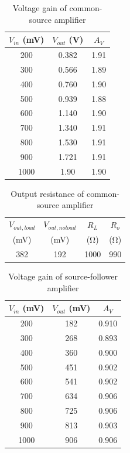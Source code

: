 \begin{table}[hbtp]
  \centering
  \begin{tabular}{ccc}
    $V_{in}$ (\si{mV}) & $V_{out}$ (\si{V}) & $A_V$ \\
    \hline
    200                & 0.382              & 1.91  \\
    300                & 0.566              & 1.89  \\
    400                & 0.760              & 1.90  \\
    500                & 0.939              & 1.88  \\
    600                & 1.140              & 1.90  \\
    700                & 1.340              & 1.91  \\
    800                & 1.530              & 1.91  \\
    900                & 1.721              & 1.91  \\
    1000               & 1.90               & 1.90  \\
  \end{tabular}
  \caption{\label{tab:common-source} Voltage gain of common-source amplifier}
\end{table}

\begin{table}[hbtp]
  \centering
  \begin{tabular}{cccc}
    $V_{out,load}$ & $V_{out,no load}$ & $R_L$ & $R_o$ \\
    (\si{mV}) & (\si{mV}) & (\si{\ohm}) & (\si{\ohm}) \\
    \hline
    382 & 192 & 1000 & 990 \\
    \end{tabular}
    \caption{\label{tab:ro_common} Output resistance of common-source amplifier}
\end{table}

\begin{table}[hbtp]
  \centering
  \begin{tabular}{ccc}
    $V_{in}$ (\si{mV}) & $V_{out}$ (\si{mV}) & $A_V$ \\
    \hline
    200                & 182                 & 0.910 \\
    300                & 268                 & 0.893 \\
    400                & 360                 & 0.900 \\
    500                & 451                 & 0.902 \\
    600                & 541                 & 0.902 \\
    700                & 634                 & 0.906 \\
    800                & 725                 & 0.906 \\
    900                & 813                 & 0.903 \\
    1000               & 906                 & 0.906 \\
  \end{tabular}
  \caption{\label{tab:source-follower} Voltage gain of source-follower amplifier}
\end{table}

